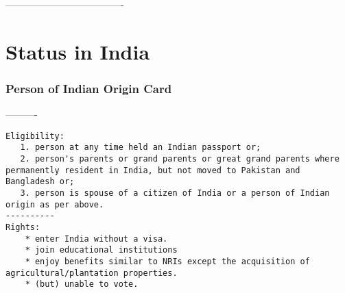 \documentclass[oneside, article]{memoir}
\begin{document}
-------------------------------------
\part{Status in India}
\section{Person of Indian Origin Card}
----------
\begin{verbatim}
Eligibility:
   1. person at any time held an Indian passport or;
   2. person's parents or grand parents or great grand parents where permanently resident in India, but not moved to Pakistan and Bangladesh or;
   3. person is spouse of a citizen of India or a person of Indian origin as per above.
----------
Rights:
    * enter India without a visa.
    * join educational institutions
    * enjoy benefits similar to NRIs except the acquisition of agricultural/plantation properties.
    * (but) unable to vote.
\end{verbatim}
\end{document}
